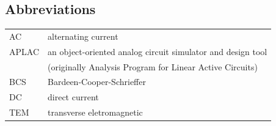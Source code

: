 \documentclass[english, 12pt, a4paper, sci, utf8, a-2b, online]{aaltothesis}
\begin{document}
\subsection*{Abbreviations}

\begin{tabular}{ll}
AC         & alternating current \\
APLAC      & an object-oriented analog circuit simulator and design tool \\
           & (originally Analysis Program for Linear Active Circuits) \\
BCS        & Bardeen-Cooper-Schrieffer \\ %
DC         & direct current \\
TEM        & transverse eletromagnetic
\end{tabular}


\cleardoublepage









\thesisbibliography
\end{document}
